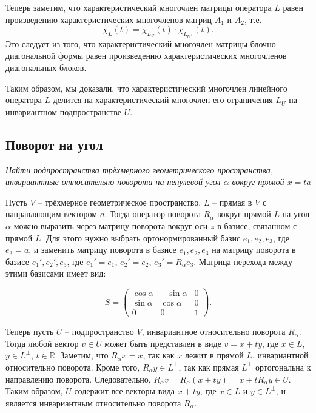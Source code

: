 Теперь заметим, что характеристический многочлен матрицы оператора $L$ равен произведению характеристических
многочленов матриц $A_1$ и $A_2$, т.е.
\[ \chi_L(t) = \chi_{L_U}(t) \cdot \chi_{L_{U^\perp}}(t). \]
Это следует из того, что характеристический многочлен матрицы блочно-диагональной формы равен произведению
характеристических многочленов диагональных блоков.

Таким образом, мы доказали, что характеристический многочлен линейного оператора $L$ делится на
характеристический многочлен его ограничения $L_U$ на инвариантном подпространстве $U$.

 \subsection*{Поворот на угол}

\textit{Найти подпространства трёхмерного геометрического пространства, инвариантные относительно поворота на
ненулевой угол $\alpha$ вокруг прямой $x = ta$}

Пусть $V$ -- трёхмерное геометрическое пространство, $L$ -- прямая в $V$ с направляющим вектором $a$.
Тогда оператор поворота $R_{\alpha}$ вокруг прямой $L$ на угол $\alpha$ можно выразить через матрицу поворота
вокруг оси $z$ в базисе, связанном с прямой $L$.
Для этого нужно выбрать ортонормированный базис $e_1, e_2, e_3$, где $e_3 = a$, и заменить матрицу поворота в
базисе $e_1, e_2, e_3$ на матрицу поворота в базисе $e_1', e_2', e_3$, где $e_1' = e_1$, $e_2' = e_2$,
$e_3' = R_{\alpha}e_3$.
Матрица перехода между этими базисами имеет вид:

\[
    S = \begin{pmatrix}
            \cos\alpha & -\sin\alpha & 0 \\
            \sin\alpha & \cos\alpha  & 0 \\
            0          & 0           & 1
    \end{pmatrix}.
\]

Теперь пусть $U$ -- подпространство $V$, инвариантное относительно поворота $R_{\alpha}$.
Тогда любой вектор $v \in U$ может быть представлен в виде $v = x + ty$, где $x \in L$, $y \in L^{\perp}$,
$t \in \mathbb{R}$.
Заметим, что $R_{\alpha}x = x$, так как $x$ лежит в прямой $L$, инвариантной относительно поворота.
Кроме того, $R_{\alpha}y \in L^{\perp}$, так как прямая $L^{\perp}$ ортогональна к направлению поворота.
Следовательно, $R_{\alpha}v = R_{\alpha}(x + ty) = x + tR_{\alpha}y \in U$.
Таким образом, $U$ содержит все векторы вида $x + ty$, где $x \in L$ и $y \in L^{\perp}$, и является инвариантным
относительно поворота $R_{\alpha}$.

